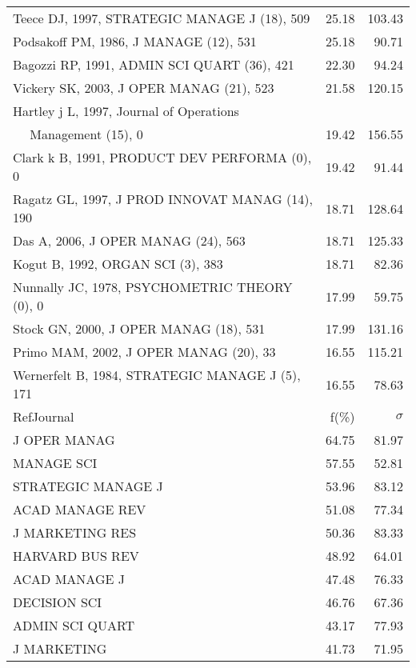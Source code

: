 \documentclass[a4paper,11pt]{report}
\begin{document}
\begin{landscape}
\begin{table}[!ht]
{\begin{tabular}{|l r r|}
Teece DJ, 1997, STRATEGIC MANAGE J (18), 509 & 25.18 & 103.43\\
Podsakoff PM, 1986, J MANAGE (12), 531 & 25.18 & 90.71\\
Bagozzi RP, 1991, ADMIN SCI QUART (36), 421 & 22.30 & 94.24\\
Vickery SK, 2003, J OPER MANAG (21), 523 & 21.58 & 120.15\\
Hartley j L, 1997, Journal of Operations &  & \\
$\quad$ Management (15), 0 & 19.42 & 156.55\\
Clark k B, 1991, PRODUCT DEV PERFORMA (0), 0 & 19.42 & 91.44\\
Ragatz GL, 1997, J PROD INNOVAT MANAG (14), 190 & 18.71 & 128.64\\
Das A, 2006, J OPER MANAG (24), 563 & 18.71 & 125.33\\
Kogut B, 1992, ORGAN SCI (3), 383 & 18.71 & 82.36\\
Nunnally JC, 1978, PSYCHOMETRIC THEORY (0), 0 & 17.99 & 59.75\\
Stock GN, 2000, J OPER MANAG (18), 531 & 17.99 & 131.16\\
Primo MAM, 2002, J OPER MANAG (20), 33 & 16.55 & 115.21\\
Wernerfelt B, 1984, STRATEGIC MANAGE J (5), 171 & 16.55 & 78.63\\
\hline
\hline
RefJournal & f(\%) & $\sigma$\\
\hline
J OPER MANAG & 64.75 & 81.97\\
MANAGE SCI & 57.55 & 52.81\\
STRATEGIC MANAGE J & 53.96 & 83.12\\
ACAD MANAGE REV & 51.08 & 77.34\\
J MARKETING RES & 50.36 & 83.33\\
HARVARD BUS REV & 48.92 & 64.01\\
ACAD MANAGE J & 47.48 & 76.33\\
DECISION SCI & 46.76 & 67.36\\
ADMIN SCI QUART & 43.17 & 77.93\\
J MARKETING & 41.73 & 71.95\\
\hline
\end{tabular}
}
\end{table}

\clearpage


\end{landscape}
\end{document}
